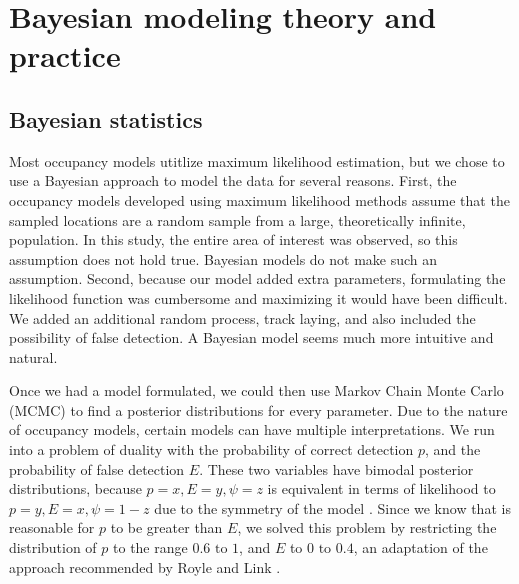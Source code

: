 \documentclass[12pt]{article}
\begin{document}
\section{Bayesian modeling theory and practice}

    \subsection{Bayesian statistics}
	Most occupancy models utitlize maximum likelihood estimation, but we chose 
	to use a Bayesian approach to model the data for several reasons. 
	First, the occupancy models developed using maximum likelihood methods 
	assume that the sampled locations are a random sample from a large, 
	theoretically infinite, population.  In this study, the entire area of 
	interest was observed, so this assumption does not hold true.  Bayesian 
	models do not make such an assumption.  Second, because our model added extra
	parameters, formulating the likelihood function was cumbersome and maximizing
	it would have been difficult.  We added an additional random process, track 
	laying, and also included the possibility of false detection.  A Bayesian
	model seems much more intuitive and natural. 

    Once we had a model formulated, we could then use Markov Chain Monte Carlo 
	(MCMC) to find a posterior distributions for every parameter. Due to the 
	nature of occupancy models, certain models can have multiple interpretations.
	We run into a problem of duality with the probability of correct detection
    \(p\), and the probability of false detection \(E\). These two variables
    have bimodal posterior distributions, because \(p=x,E=y,\psi=z\) is 
	equivalent in terms of likelihood to \(p=y,E=x,\psi=1-z\) due to the 
	symmetry of the model \cite{Royle2006}.  Since we know that is reasonable 
	for \(p\) to be greater than \(E\), we solved this problem by restricting 
	the distribution of \(p\) to the range \(0.6\text{ to }1\), and \(E\) to 
	\(0\text{ to }0.4\), an adaptation of the approach recommended by Royle and 
	Link \cite{Royle2006}. 
\end{document}
